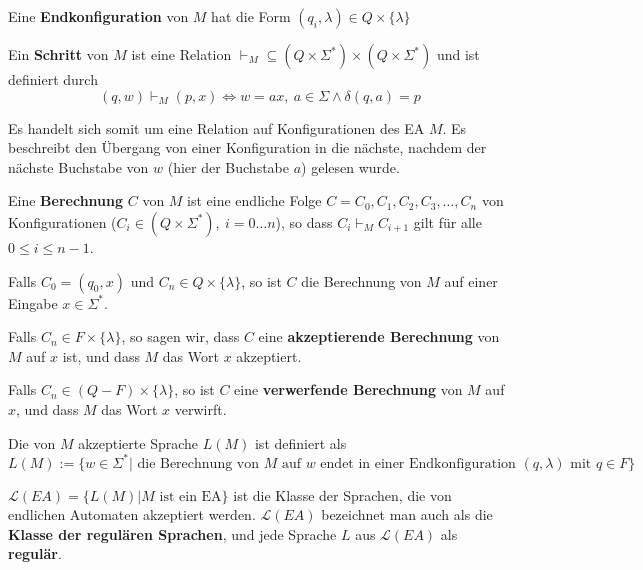 \begin{definition}
Eine \textbf{Endkonfiguration} von $M$ hat die Form $(q_i, \lambda) \in Q \times \{ \lambda \}$\\
\end{definition}

\begin{definition}
Ein \textbf{Schritt} von $M$ ist eine Relation $\vdash_M \subseteq (Q \times \Sigma^*) \times (Q \times \Sigma^*)$ und ist definiert durch
\[
(q, w) \vdash_{M} (p, x) \Leftrightarrow w = ax,\ a \in \Sigma \land \delta(q, a) = p
\]

Es handelt sich somit um eine Relation auf Konfigurationen des EA $M$. Es beschreibt den Übergang von einer Konfiguration in die nächste, nachdem der nächste Buchstabe von $w$ (hier der Buchstabe $a$) gelesen wurde.\\
\end{definition}

\begin{definition}
Eine \textbf{Berechnung} $C$ von $M$ ist eine endliche Folge $C = C_0, C_1, C_2, C_3, \ldots, C_n$ von Konfigurationen ($C_i \in (Q \times \Sigma^*),\ i=0 \ldots n$), so dass $C_i \vdash_M C_{i+1}$ gilt für alle $0 \leq i \leq n-1$.

Falls $C_0 = (q_0, x)$ und $C_n \in Q \times \{ \lambda \}$, so ist $C$  die Berechnung von $M$ auf einer Eingabe $x \in \Sigma^*$.

Falls $C_n \in F \times \{ \lambda \}$, so sagen wir, dass $C$ eine \textbf{akzeptierende Berechnung} von $M$ auf $x$ ist, und dass $M$ das Wort $x$ akzeptiert.

Falls $C_n \in (Q - F) \times \{ \lambda \}$, so ist $C$ eine \textbf{verwerfende Berechnung} von $M$ auf $x$, und dass $M$ das Wort $x$ verwirft.\\
\end{definition}

\begin{definition}
Die von $M$ akzeptierte Sprache $L(M)$ ist definiert als
\[
L(M) := \{ w \in \Sigma^* | \text{ die Berechnung von $M$ auf $w$ endet in einer Endkonfiguration $(q, \lambda)$ mit $q \in F$} \}
\]
\end{definition}

\begin{definition}
$\mathcal{L}(EA) = \{L(M) | M \text{ ist ein EA} \}$ ist die Klasse der Sprachen, die von endlichen Automaten akzeptiert werden. $\mathcal{L}(EA)$ bezeichnet man auch als die \textbf{Klasse der regulären Sprachen}, und jede Sprache $L$ aus $\mathcal{L}(EA)$ als \textbf{regulär}.\\
\end{definition}


